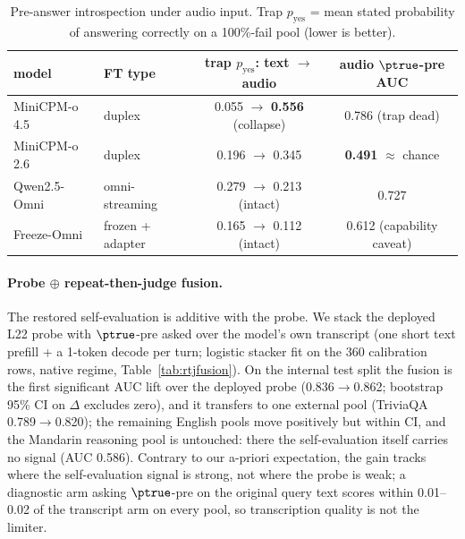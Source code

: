 \begin{table}[h]
\centering\small
\caption{Pre-answer introspection under audio input. Trap
$p_{\mathrm{yes}}$ = mean stated probability of answering correctly on
a 100\%-fail pool (lower is better).}
\label{tab:audioptrue}
\begin{tabular}{llcc}
\toprule
model & FT type & trap $p_{\mathrm{yes}}$: text $\rightarrow$ audio & audio $\ptrue$-pre AUC \\
\midrule
MiniCPM-o 4.5 & duplex & 0.055 $\rightarrow$ \textbf{0.556} (collapse) & 0.786 (trap dead) \\
MiniCPM-o 2.6 & duplex & 0.196 $\rightarrow$ 0.345 & \textbf{0.491} $\approx$ chance \\
Qwen2.5-Omni & omni-streaming & 0.279 $\rightarrow$ 0.213 (intact) & 0.727 \\
Freeze-Omni & frozen + adapter & 0.165 $\rightarrow$ 0.112 (intact) & 0.612 (capability caveat) \\
\bottomrule
\end{tabular}
\end{table}

\paragraph{Probe $\oplus$ repeat-then-judge fusion.} The restored
self-evaluation is additive with the probe. We stack the
deployed L22 probe with $\ptrue$-pre asked over the model's own
transcript (one short text prefill + a 1-token decode per turn;
logistic stacker fit on the 360 calibration rows, native regime,
Table~\ref{tab:rtjfusion}). On the internal test split the fusion is
the first significant AUC lift over the deployed probe
(0.836$\to$0.862; bootstrap 95\% CI on $\Delta$ excludes zero), and it
transfers to one external pool (TriviaQA 0.789$\to$0.820); the
remaining English pools move positively but within CI, and the
Mandarin reasoning pool is untouched: there the self-evaluation
itself carries no signal (AUC 0.586). Contrary to our a-priori
expectation, the gain tracks where the self-evaluation signal is
strong, not where the probe is weak; a diagnostic arm asking
$\ptrue$-pre on the original query text scores within 0.01--0.02 of
the transcript arm on every pool, so transcription quality is not the
limiter.

